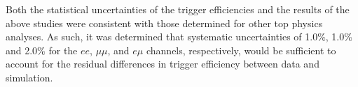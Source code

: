 Both the statistical uncertainties of the trigger efficiencies and the results of the above studies were consistent with those determined for other top physics analyses.
As such, it was determined that  systematic uncertainties of 1.0\%, 1.0\% and 2.0\% for the $ee$, $\mu\mu$, and $e\mu$ channels, respectively, would be sufficient to account for the residual differences in trigger efficiency between data and simulation.

%

%

